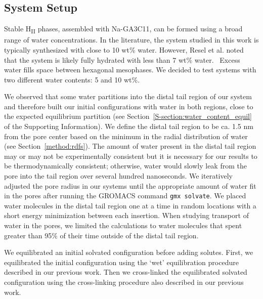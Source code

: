 \documentclass[journal=jpcbfk,manuscript=article]{achemso}
\begin{document}
  \subsection{System Setup}\label{method:system_setup}

  Stable H\textsubscript{II} phases, assembled with Na-GA3C11, can be formed
  using a broad range of water concentrations. In the literature, the system 
  studied in this work is typically synthesized with close to 10 wt\% water.
  \cite{smith_ordered_1997, zhou_new_2007} However, Resel et al. noted that the
  system is likely fully hydrated with less than 7 wt\% water.~\cite{resel_h2-phase_2000}
  Excess water fills space between hexagonal mesophases. We decided to test 
  systems with two different water contents: 5 and 10 wt\%.

  We observed that some water partitions into the distal tail region of our system and therefore
  built our initial configurations with water in both regions, close to the expected
  equilibrium partition (see Section~\ref{S-section:water_content_equil} of the Supporting
  Information). We define the distal tail region to be ca. 1.5 nm from the pore
  center based on the minimum in the radial distribution of water
  (see Section~\ref{method:rdfs}). The amount of water present in the distal tail region
  may or may not be experimentally consistent but it is necessary for our results to be 
  thermodynamically consistent;
  otherwise, water would slowly leak from the pore into the tail region over several hundred nanoseconds.
We iteratively adjusted the pore radius in our systems
  until the appropriate amount of water fit in the pores after running the GROMACS command
  \texttt{gmx solvate}. We placed water molecules in the distal tail region one at a time
  in random locations with a short energy minimization between each insertion. When 
  studying transport of water in the pores, we limited the calculations to water molecules
  that spent greater than 95\% of their time outside of the distal tail region.

  We equilibrated an initial solvated configuration before adding solutes. First, we 
  equilibrated the initial configuration using the `wet' equilibration procedure 
  described in our previous work. Then we cross-linked the equilibrated solvated 
  configuration using the cross-linking procedure also described in our previous 
  work.~\cite{coscia_understanding_2019}
\end{document}
